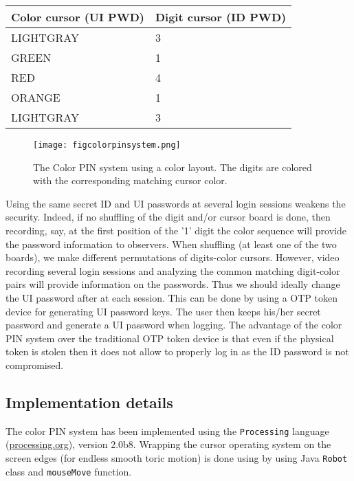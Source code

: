 \documentclass[12pt,onecolumn]{article}
\begin{document}
\begin{center}
 \begin{tabular}{ll}
 Color cursor (UI PWD) & Digit cursor (ID PWD) \\ \hline\hline
 LIGHTGRAY& 3\\
  GREEN& 1 \\
   RED& 4\\
    ORANGE& 1\\
     LIGHTGRAY & 3
     \end{tabular}
     \end{center}


  

\begin{figure}
\centering
\texttt{[image: figcolorpinsystem.png]}

\caption{\label{fig:colorPIN}The Color PIN system using a  color layout. The digits are colored with the corresponding matching cursor color.}
\end{figure}

Using the same secret ID and UI passwords at several login sessions weakens the security.
Indeed, if no shuffling of the digit and/or cursor board is done, then recording, say, at the first position of the '1' digit the color sequence will provide the password information to observers. When shuffling (at least one of the two boards), we make different permutations of digits-color cursors.
However, video recording several login sessions and analyzing the common matching digit-color pairs will provide information on the passwords.
Thus we should ideally change the UI password after at each session. This can be done by using a OTP token device for generating UI password keys.
The user then keeps his/her secret password and generate a UI password when logging. The advantage of the color PIN system over the traditional OTP token device is that even if the physical token is stolen then it does not allow to properly log in as the ID password is not compromised.



\subsection{Implementation details}
The color PIN system has been implemented using the {\tt Processing} language (\url{processing.org}), version 2.0b8.
Wrapping the cursor operating system on the screen edges (for endless smooth toric motion) is done using by using Java\texttrademark{} {\tt Robot} class and {\tt mouseMove} function.
 
\end{document}

